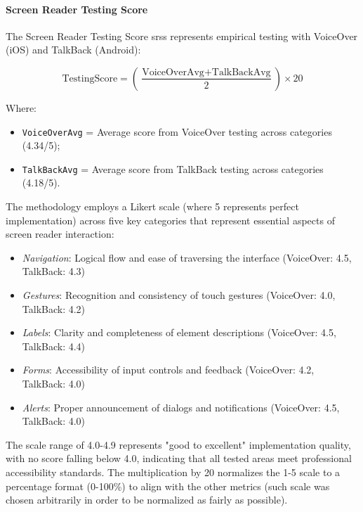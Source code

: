 \FloatBarrier

\paragraph{Screen Reader Testing Score}

The Screen Reader Testing Score \gls{srss} represents empirical testing with VoiceOver (iOS) and TalkBack (Android):

\begin{equation}
\text{TestingScore} 
= \left(\frac{\text{VoiceOverAvg} + \text{TalkBackAvg}}{2}\right) \times 20
\end{equation}

Where:
\begin{itemize}
    \item \texttt{VoiceOverAvg} = Average score from VoiceOver testing across categories (4.34/5);
    \item \texttt{TalkBackAvg} = Average score from TalkBack testing across categories (4.18/5).
\end{itemize}

The methodology employs a Likert scale (where 5 represents perfect implementation) across five key categories that represent essential aspects of screen reader interaction:
\begin{itemize}
\item \textit{Navigation}: Logical flow and ease of traversing the interface (VoiceOver: 4.5, TalkBack: 4.3)
\item \textit{Gestures}: Recognition and consistency of touch gestures (VoiceOver: 4.0, TalkBack: 4.2)
\item \textit{Labels}: Clarity and completeness of element descriptions (VoiceOver: 4.5, TalkBack: 4.4)
\item \textit{Forms}: Accessibility of input controls and feedback (VoiceOver: 4.2, TalkBack: 4.0)
\item \textit{Alerts}: Proper announcement of dialogs and notifications (VoiceOver: 4.5, TalkBack: 4.0)
\end{itemize}

The scale range of 4.0-4.9 represents "good to excellent" implementation quality, with no score falling below 4.0, indicating that all tested areas meet professional accessibility standards. The multiplication by 20 normalizes the 1-5 scale to a percentage format (0-100\%) to align with the other metrics (such scale was chosen arbitrarily in order to be normalized as fairly as possible). 

